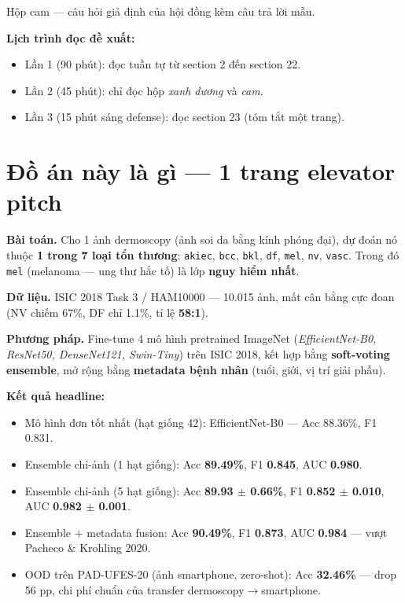 \documentclass[11pt,a4paper]{article}
\begin{document}
\begin{qa}
Hộp cam --- câu hỏi giả định của hội đồng kèm câu trả lời mẫu.
\end{qa}

\textbf{Lịch trình đọc đề xuất:}
\begin{itemize}[leftmargin=*]
  \item Lần 1 (90 phút): đọc tuần tự từ section 2 đến section 22.
  \item Lần 2 (45 phút): chỉ đọc hộp \textit{xanh dương} và \textit{cam}.
  \item Lần 3 (15 phút sáng defense): đọc section 23 (tóm tắt một trang).
\end{itemize}

\section{Đồ án này là gì --- 1 trang elevator pitch}

\textbf{Bài toán.} Cho 1 ảnh dermoscopy (ảnh soi da bằng kính phóng đại), dự đoán nó thuộc \textbf{1 trong 7 loại tổn thương}: \texttt{akiec}, \texttt{bcc}, \texttt{bkl}, \texttt{df}, \texttt{mel}, \texttt{nv}, \texttt{vasc}. Trong đó \texttt{mel} (melanoma --- ung thư hắc tố) là lớp \textbf{nguy hiểm nhất}.

\textbf{Dữ liệu.} ISIC 2018 Task 3 / HAM10000 --- 10.015 ảnh, mất cân bằng cực đoan (NV chiếm 67\%, DF chỉ 1.1\%, tỉ lệ \textbf{58:1}).

\textbf{Phương pháp.} Fine-tune 4 mô hình pretrained ImageNet (\textit{EfficientNet-B0, ResNet50, DenseNet121, Swin-Tiny}) trên ISIC 2018, kết hợp bằng \textbf{soft-voting ensemble}, mở rộng bằng \textbf{metadata bệnh nhân} (tuổi, giới, vị trí giải phẫu).

\textbf{Kết quả headline:}
\begin{itemize}[leftmargin=*]
  \item Mô hình đơn tốt nhất (hạt giống 42): EfficientNet-B0 --- Acc 88.36\%, F1 0.831.
  \item Ensemble chỉ-ảnh (1 hạt giống): Acc \textbf{89.49\%}, F1 \textbf{0.845}, AUC \textbf{0.980}.
  \item Ensemble chỉ-ảnh (5 hạt giống): Acc \textbf{89.93 $\pm$ 0.66\%}, F1 \textbf{0.852 $\pm$ 0.010}, AUC \textbf{0.982 $\pm$ 0.001}.
  \item Ensemble $+$ metadata fusion: Acc \textbf{90.49\%}, F1 \textbf{0.873}, AUC \textbf{0.984} --- vượt Pacheco \& Krohling 2020.
  \item OOD trên PAD-UFES-20 (ảnh smartphone, zero-shot): Acc \textbf{32.46\%} --- drop 56 pp, chi phí chuẩn của transfer dermoscopy$\to$smartphone.
\end{itemize}
\end{document}
